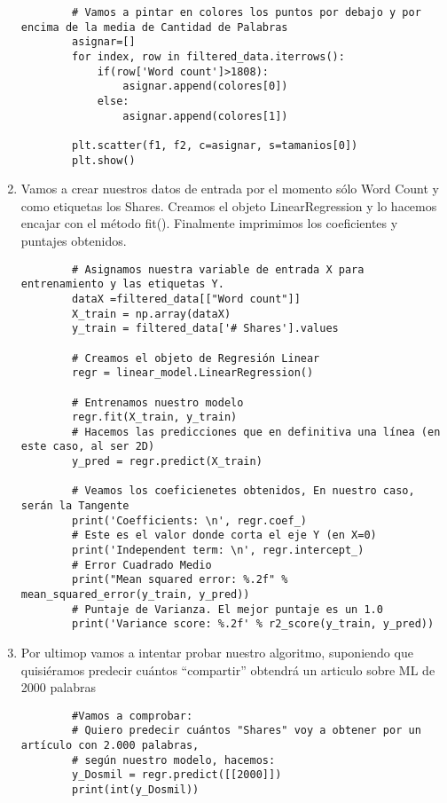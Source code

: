 \documentclass{article}
\begin{document}
\begin{enumerate}
\begin{verbatim}
        # Vamos a pintar en colores los puntos por debajo y por encima de la media de Cantidad de Palabras
        asignar=[]
        for index, row in filtered_data.iterrows():
            if(row['Word count']>1808):
                asignar.append(colores[0])
            else:
                asignar.append(colores[1])

        plt.scatter(f1, f2, c=asignar, s=tamanios[0])
        plt.show()
    \end{verbatim}
    \item Vamos a crear nuestros datos de entrada por el momento sólo Word Count y como etiquetas los 
    Shares. Creamos el objeto LinearRegression y lo hacemos encajar con el método fit().
    Finalmente imprimimos los coeficientes y puntajes obtenidos.
    \begin{verbatim} 
        # Asignamos nuestra variable de entrada X para entrenamiento y las etiquetas Y.
        dataX =filtered_data[["Word count"]]
        X_train = np.array(dataX)
        y_train = filtered_data['# Shares'].values

        # Creamos el objeto de Regresión Linear
        regr = linear_model.LinearRegression()

        # Entrenamos nuestro modelo
        regr.fit(X_train, y_train)
        # Hacemos las predicciones que en definitiva una línea (en este caso, al ser 2D)
        y_pred = regr.predict(X_train)

        # Veamos los coeficienetes obtenidos, En nuestro caso, serán la Tangente
        print('Coefficients: \n', regr.coef_)
        # Este es el valor donde corta el eje Y (en X=0)
        print('Independent term: \n', regr.intercept_)
        # Error Cuadrado Medio
        print("Mean squared error: %.2f" % mean_squared_error(y_train, y_pred))
        # Puntaje de Varianza. El mejor puntaje es un 1.0
        print('Variance score: %.2f' % r2_score(y_train, y_pred))
    \end{verbatim}
    \item Por ultimop vamos a intentar probar nuestro algoritmo, suponiendo que quisiéramos predecir cuántos “compartir” obtendrá un articulo sobre ML de 2000 palabras
    \begin{verbatim}
        #Vamos a comprobar:
        # Quiero predecir cuántos "Shares" voy a obtener por un artículo con 2.000 palabras,
        # según nuestro modelo, hacemos:
        y_Dosmil = regr.predict([[2000]])
        print(int(y_Dosmil))    
    \end{verbatim}
\end{enumerate}
\end{document}
